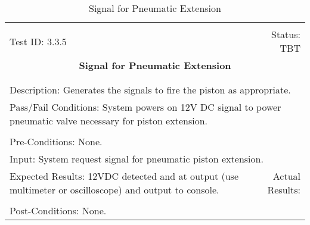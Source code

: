 \documentclass[titlepage]{article}
\begin{document}
\begin{center}%
\begin{table}[h!]
\begin{tabular}{|l r|}\hline&\\[-2mm]
	Test ID: 3.3.5	&Status: TBT\\[-3mm]
	\multicolumn{2}{|c|}{\textbf{\large{Signal for Pneumatic Extension}}}\\&\\\hline&\\[-3mm]
	\multicolumn{2}{|p{\textwidth}|}{Description: Generates the signals to fire the piston as appropriate.}\\\hline
	\multicolumn{2}{|p{\textwidth}|}{Pass/Fail Conditions: System powers on 12V DC signal to power pneumatic valve necessary for piston extension.}\\[1mm]\hline&\\[-3mm]
	\multicolumn{2}{|p{\textwidth}|}{Pre-Conditions: None.}\\[4mm]
	\multicolumn{2}{|p{\textwidth}|}{Input: System request signal for pneumatic piston extension.}\\[2mm]\hline
	\multicolumn{1}{|p{0.49\textwidth}}{Expected Results: 12VDC detected and at output (use multimeter or oscilloscope) and output to console.}	&\multicolumn{1}{|p{0.45\textwidth}|}{Actual Results: }\\\hline&\\[-3mm]
	\multicolumn{2}{|p{\textwidth}|}{Post-Conditions: None.}\\\hline
\end{tabular}
\caption{Signal for Pneumatic Extension}
\end{table}
\end{center}
\newpage
\end{document}
